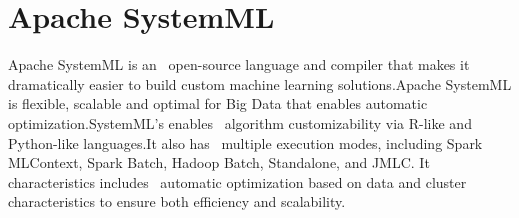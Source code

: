 \section{Apache SystemML}

Apache SystemML is an~\cite{systemml} open-source language and
compiler that makes it dramatically easier to build custom machine
learning solutions.Apache SystemML is \cite{systemml} flexible,
scalable and optimal for Big Data that enables automatic
optimization.SystemML's enables~\cite{systemml} algorithm
customizability via R-like and Python-like languages.It also
has~\cite{systemml_blog} multiple execution modes, including Spark
MLContext, Spark Batch, Hadoop Batch, Standalone, and JMLC. It
characteristics includes~\cite{systemml_blog} automatic optimization
based on data and cluster characteristics to ensure both efficiency
and scalability.

